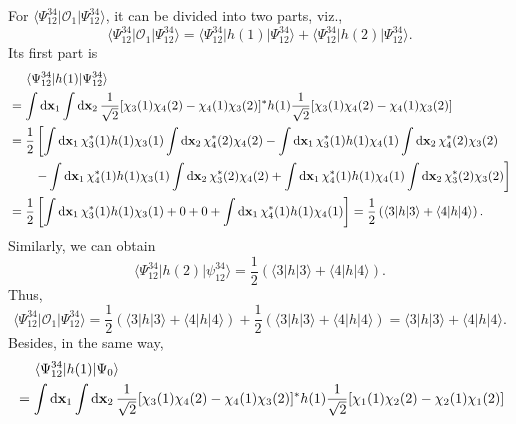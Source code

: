 \documentclass[a4paper]{book}
\newcommand*{\dif}{\mathop{}\!\mathrm{d}}
\newcommand{\bfx}{{\bf x}}
\begin{document}
	\begin{solution}
	For $\langle \Psi_{12}^{34} | \mathscr{O}_1 | \Psi_{12}^{34} \rangle$, it can be divided into two parts, viz.,
	\[
		\langle \Psi_{12}^{34} | \mathscr{O}_1 | \Psi_{12}^{34} \rangle = \langle \Psi_{12}^{34} | h(1) | \Psi_{12}^{34} \rangle + \langle \Psi_{12}^{34} | h(2) | \Psi_{12}^{34} \rangle.
	\]
	Its first part is
	\begin{align*}
		&\hspace{1.4em}\langle \Psi_{12}^{34} | h(1) | \Psi_{12}^{34} \rangle \\
		&=  \int \dif \bfx_1 \int \dif \bfx_2 \, \frac{1}{\sqrt{2}}[ \chi_3(1) \chi_4(2) - \chi_4(1) \chi_3(2) ]^* h(1) \frac{1}{\sqrt{2}}[ \chi_3(1) \chi_4(2) - \chi_4(1) \chi_3(2) ] \\
		&= \frac{1}{2} \left[ \int \dif \bfx_1 \, \chi_3^*(1) h(1) \chi_3(1) \int \dif \bfx_2 \, \chi^*_4(2) \chi_4(2) - \int \dif \bfx_1 \, \chi_3^*(1) h(1) \chi_4(1) \int \dif \bfx_2 \, \chi^*_4(2) \chi_3(2) \right. \\
		&\hspace{2em} \left. - \int \dif \bfx_1 \, \chi_4^*(1) h(1) \chi_3(1) \int \dif \bfx_2 \, \chi^*_3(2) \chi_4(2) + \int \dif \bfx_1 \, \chi_4^*(1) h(1) \chi_4(1) \int \dif \bfx_2 \, \chi^*_3(2) \chi_3(2) \right] \\
		&= \frac{1}{2} \left[ \int \dif \bfx_1 \, \chi_3^*(1) h(1) \chi_3(1) + 0 + 0 + \int \dif \bfx_1 \, \chi_4^*(1) h(1) \chi_4(1) \right] = \frac{1}{2} \left( \langle 3 | h | 3 \rangle + \langle 4 | h | 4 \rangle \right).
	\end{align*}
	Similarly, we can obtain
	\[
		\langle \Psi_{12}^{34} | h(2) | \psi_{12}^{34} \rangle = \frac{1}{2} \left( \langle 3 | h | 3 \rangle + \langle 4 | h | 4 \rangle \right).
	\]
	Thus,
	\begin{equation}
		\langle \Psi_{12}^{34} | \mathscr{O}_1 | \Psi_{12}^{34} \rangle = \frac{1}{2} \left( \langle 3 | h | 3 \rangle + \langle 4 | h | 4 \rangle \right) + \frac{1}{2} \left( \langle 3 | h | 3 \rangle + \langle 4 | h | 4 \rangle \right) = \langle 3 | h | 3 \rangle + \langle 4 | h | 4 \rangle .
	\end{equation}
	Besides, in the same way,
	\begin{align*}
		&\hspace{1.4em}\langle \Psi_{12}^{34} | h(1) | \Psi_0 \rangle \\
		&=  \int \dif \bfx_1 \int \dif \bfx_2 \, \frac{1}{\sqrt{2}}[ \chi_3(1) \chi_4(2) - \chi_4(1) \chi_3(2) ]^* h(1) \frac{1}{\sqrt{2}}[ \chi_1(1) \chi_2(2) - \chi_2(1) \chi_1(2) ] \\

\end{align*}
\end{solution}
\end{document}
